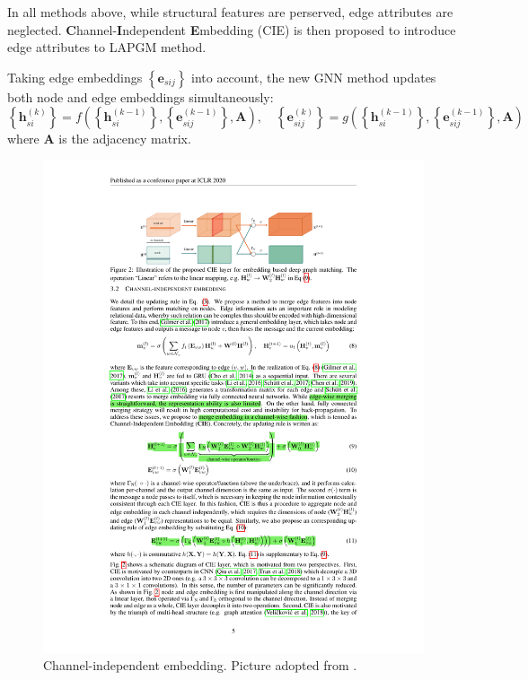 \documentclass[a4paper]{article}
\newcommand{\set}[1]{\left\{#1\right\}}
\begin{document}
In all methods above, while structural features are perserved, edge attributes are neglected. \textbf{C}hannel-\textbf{I}ndependent \textbf{E}mbedding (CIE) \cite{cie} is then proposed to introduce edge attributes to LAPGM method. 

Taking edge embeddings $\set{\mathbf{e}_{sij}}$ into account, the new GNN method updates both node and edge embeddings simultaneously:
$$
\set{\mathbf{h}_{si}^{(k)}}  = f\left(\set{\mathbf{h}_{si}^{(k-1)}}, \set{\mathbf{e}_{sij}^{(k-1)}}, \mathbf{A}\right), \quad \set{\mathbf{e}_{sij}^{(k)}}  = g\left(\set{\mathbf{h}_{si}^{(k-1)}}, \set{\mathbf{e}_{sij}^{(k-1)}}, \mathbf{A}\right)
$$
where $\mathbf{A}$ is the adjacency matrix.


\begin{figure}[htbp]
    \centering
    \includegraphics[width=0.6\linewidth]{Images/cie-detail.pdf}
    \caption{Channel-independent embedding. Picture adopted from \cite{cie}.}
\end{figure}
\end{document}

